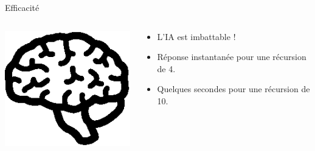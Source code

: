 \documentclass[compress, 12pt]{beamer}
\begin{document}
\begin{frame}{Efficacité}
    \begin{columns}
        \begin{column}{.2\textwidth}
            \includegraphics[width=1.3\textwidth]{./pix/sym_brain}
        \end{column}
        \begin{column}{.6\textwidth}
        \begin{itemize}
            \itemsep2em
	        \item L'IA est imbattable !
	        \item Réponse instantanée pour une récursion de 4.
	        \item Quelques secondes pour une récursion de 10.
        \end{itemize}
        \end{column}
    \end{columns}
\end{frame}
\end{document}
